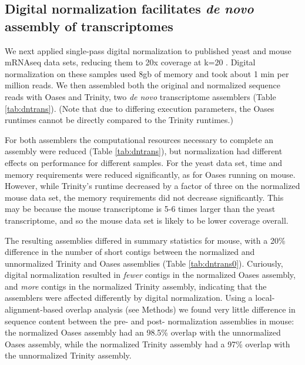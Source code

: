 \documentclass[10pt]{article}
\begin{document}

\subsection*{Digital normalization facilitates {\em de novo} assembly of transcriptomes}

We next applied single-pass digital normalization to published yeast
and mouse mRNAseq data sets, reducing them to 20x coverage at k=20
\cite{pubmed21572440}.
Digital normalization on these samples used 8gb of memory and took
about 1 min per million reads.  We then assembled both the original and
normalized sequence reads with Oases and Trinity, two {\em de novo}
transcriptome assemblers (Table \ref{tab:dntrans}).  (Note that due to
differing execution parameters, the Oases runtimes cannot be directly compared
to the Trinity runtimes.)

For both assemblers the computational resources necessary to complete an
assembly were reduced (Table \ref{tab:dntrans}), but normalization had
different effects on performance for different samples.  For the yeast
data set, time and memory requirements were reduced significantly,
as for Oases running on mouse.  However, while Trinity's runtime decreased
by a factor of three on the normalized mouse data set, the memory requirements
did not decrease significantly.  This may be because the mouse transcriptome
is 5-6 times larger than the yeast transcriptome, and so the mouse data set
is likely to be lower coverage overall.


The resulting assemblies differed in summary statistics for mouse, with a
20\% difference in the number of short contigs between the normalized
and unnormalized Trinity and Oases assemblies (Table
\ref{tab:dntrans0}).
Curiously, digital normalization resulted in {\em fewer} contigs in
the normalized Oases assembly, and {\em more} contigs in the
normalized Trinity assembly, indicating that the assemblers were
affected differently by digital normalization.
Using a local-alignment-based overlap analysis (see Methods) we found
very little difference in sequence content between the pre- and post-
normalization assemblies in mouse:
the normalized Oases assembly had an 98.5\% overlap with the
unnormalized Oases assembly, while the normalized Trinity assembly had
a 97\% overlap with the unnormalized Trinity assembly.
\end{document}
